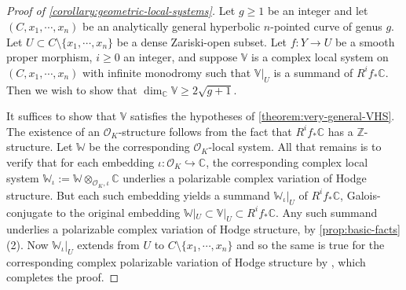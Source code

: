 \subsection{}\label{subsubsection:geometric-origin-proof}
\begin{proof}[Proof of \autoref{corollary:geometric-local-systems}]
Let $g\geq 1$ be an integer and let $(C, x_1, \cdots, x_n)$ be an analytically
general hyperbolic $n$-pointed curve of genus $g$. Let $U\subset C\setminus\{x_1, \cdots, x_n\}$ be a dense Zariski-open subset. Let $f: Y\to U$ be a smooth proper morphism, $i\geq 0$ an integer, and suppose $\mathbb{V}$ is a complex local system on $(C, x_1, \cdots, x_n)$ with infinite monodromy such that $\mathbb{V}|_U$ is a summand of $R^if_*\mathbb{C}$. Then we wish to show that $\dim_{\mathbb{C}}\mathbb{V}\geq 2\sqrt{g+1}$.

It suffices to show that $\mathbb{V}$ satisfies the hypotheses of
\autoref{theorem:very-general-VHS}. The existence of an
$\mathscr{O}_K$-structure follows from the fact that $R^if_*\mathbb{C}$ has a
$\mathbb{Z}$-structure.
Let $\mathbb{W}$ be the corresponding $\mathscr{O}_K$-local system. All that remains is to verify that for each embedding
$\iota:\mathscr{O}_K\hookrightarrow \mathbb{C}$, the corresponding complex local
system $\mathbb{W}_\iota:=\mathbb{W}\otimes_{\mathscr{O}_K, \iota} \mathbb{C}$
underlies a polarizable complex variation of Hodge structure. But  each such
embedding yields a summand $\mathbb{W}_\iota|_U$ of $R^if_*\mathbb{C}$,
Galois-conjugate to the original embedding $\mathbb{W}|_U\subset
\mathbb{V}|_U\subset R^if_*\mathbb{C}.$ Any such summand underlies a polarizable
complex variation of Hodge structure, by \autoref{prop:basic-facts}(2). Now
$\mathbb{W}_\iota|_U$ extends from $U$ to $C\setminus \{x_1, \cdots, x_n\}$ and
so the same is true for the corresponding complex polarizable variation of Hodge
structure by \cite[Corollary 4.11]{schmid1973variation}, which completes the proof.
\end{proof}

